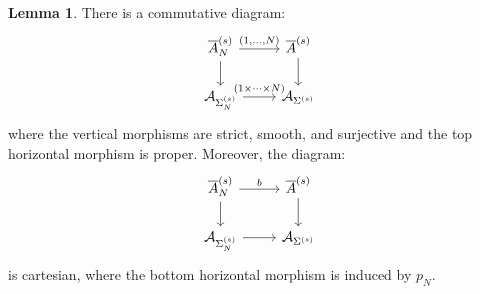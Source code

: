 \documentclass[11pt]{article}
\newcommand{\barA}{\overline{A}}
\theoremstyle{definition}
\newtheorem{lemma}[definition]{Lemma}
\begin{document}
\begin{lemma}\label{lem:Artin_fan_A_N}
	There is a commutative diagram:
	$$\begin{tikzcd}
		\barA_N^{(s)}\arrow[r,"{(1,\dots,N)}"]\arrow[d]&\barA^{(s)}\arrow[d]\\
		\mathcal{A}_{\Sigma_N^{(s)}}\arrow[r,"(1\times\dots\times N)"]&\mathcal{A}_{\Sigma^{(s)}}
	\end{tikzcd}$$
	where the vertical morphisms are strict, smooth, and surjective and
	the top horizontal morphism is proper. Moreover, the diagram:
	$$\begin{tikzcd}
		\barA_N^{(s)}\arrow[d]\arrow[r,"b"]&\barA^{(s)}\arrow[d]\\
		\mathcal{A}_{\Sigma_N^{(s)}}\arrow[r]&\mathcal{A}_{\Sigma^{(s)}}
	\end{tikzcd}$$
	is cartesian, where the bottom horizontal morphism is induced by $p_N$.
\end{lemma}
\end{document}
